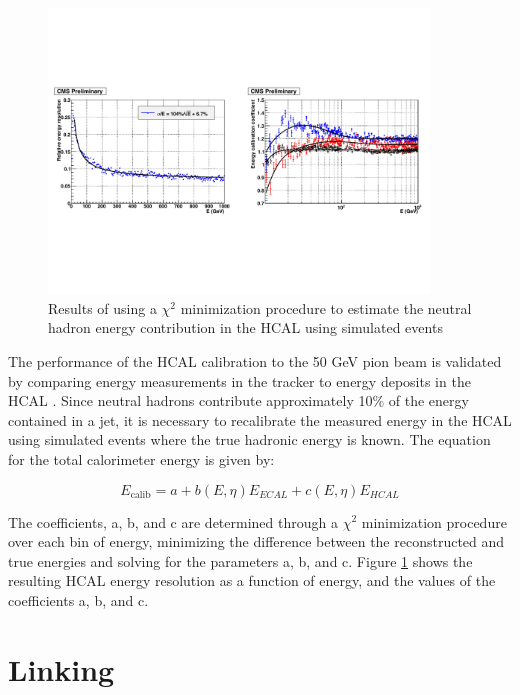 \begin{figure}[h]
   \centering
  \includegraphics[width=0.9\textwidth]{Figures/Reconstruction_Diagrams/HCAL_calibration_chi2_fit_from_ecal.pdf}
  \caption{Results of using a $\chi^{2}$ minimization procedure to
    estimate the neutral hadron energy contribution in the HCAL using
    simulated events\cite{CMS-PAS-PFT-09-001}} \label{fig:hcal_calibration}
\end{figure}

\par The performance of the HCAL calibration to the 50 GeV pion beam is
validated by comparing energy measurements in the tracker to energy
deposits in the HCAL \cite{CMS-DP-2010-025}.  Since neutral hadrons
contribute approximately 10$\%$ of the energy contained in a jet, it is
necessary to recalibrate the measured energy in the HCAL using
simulated events where the true hadronic energy is known.  The
equation for the total calorimeter energy is given by:

\begin{equation}\label{eq:calorimeter_calibration}
E_{\text{calib}} = a + b(E, \eta)E_{ECAL} + c(E, \eta)E_{HCAL}
\end{equation} 

\noindent The coefficients, a, b, and c are determined through a
$\chi^{2}$ minimization procedure over each bin of energy, minimizing
the difference between the reconstructed and true energies and solving
for the parameters a, b, and c.  Figure \ref{fig:hcal_calibration}
shows the resulting HCAL energy resolution as a function of energy,
and the values of the coefficients a, b, and c.  


\section{Linking}
\label{linking_overview}

